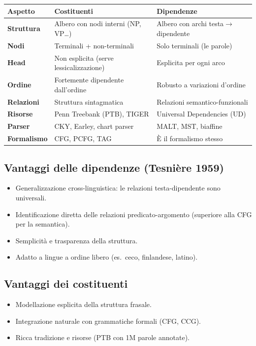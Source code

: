 \documentclass[12pt,a4paper]{article}
\begin{document}
\begin{center}
\begin{tabular}{>{\bfseries}lll}
\toprule
Aspetto & Costituenti & Dipendenze \\
\midrule
Struttura & Albero con nodi interni (NP, VP\dots) & Albero con archi testa$\to$dipendente \\
Nodi & Terminali + non-terminali & Solo terminali (le parole) \\
Head & Non esplicita (serve lessicalizzazione) & Esplicita per ogni arco \\
Ordine & Fortemente dipendente dall'ordine & Robusto a variazioni d'ordine \\
Relazioni & Struttura sintagmatica & Relazioni semantico-funzionali \\
Risorse & Penn Treebank (PTB), TIGER & Universal Dependencies (UD) \\
Parser & CKY, Earley, chart parser & MALT, MST, biaffine \\
Formalismo & CFG, PCFG, TAG & \`{E} il formalismo stesso \\
\bottomrule
\end{tabular}
\end{center}

\subsection{Vantaggi delle dipendenze (Tesnière 1959)}

\begin{itemize}[leftmargin=1.5em]
  \item Generalizzazione cross-linguistica: le relazioni testa-dipendente sono universali.
  \item Identificazione diretta delle relazioni predicato-argomento (superiore alla CFG per la semantica).
  \item Semplicità e trasparenza della struttura.
  \item Adatto a lingue a ordine libero (es.\ ceco, finlandese, latino).
\end{itemize}

\subsection{Vantaggi dei costituenti}

\begin{itemize}[leftmargin=1.5em]
  \item Modellazione esplicita della struttura frasale.
  \item Integrazione naturale con grammatiche formali (CFG, CCG).
  \item Ricca tradizione e risorse (PTB con 1M parole annotate).
\end{itemize}
\end{document}

